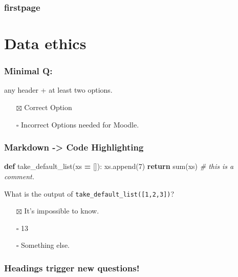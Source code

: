 \documentclass[
]{book}
\newenvironment{Shaded}{\begin{snugshade}}{\end{snugshade}}
\newcommand{\BuiltInTok}[1]{#1}
\newcommand{\CommentTok}[1]{\textcolor[rgb]{0.56,0.35,0.01}{\textit{#1}}}
\newcommand{\ControlFlowTok}[1]{\textcolor[rgb]{0.13,0.29,0.53}{\textbf{#1}}}
\newcommand{\DecValTok}[1]{\textcolor[rgb]{0.00,0.00,0.81}{#1}}
\newcommand{\KeywordTok}[1]{\textcolor[rgb]{0.13,0.29,0.53}{\textbf{#1}}}
\newcommand{\NormalTok}[1]{#1}
\newcommand{\OperatorTok}[1]{\textcolor[rgb]{0.81,0.36,0.00}{\textbf{#1}}}
\providecommand{\tightlist}{%
  \setlength{\itemsep}{0pt}\setlength{\parskip}{0pt}}
\begin{document}
\hypertarget{firstpage}{%
\subsection{firstpage}\label{firstpage}}

\hypertarget{data-ethics}{%
\chapter{Data ethics}\label{data-ethics}}

\hypertarget{minimal-q}{%
\subsection{Minimal Q:}\label{minimal-q}}

any header + at least two options.

\begin{itemize}
\tightlist
\item[$\boxtimes$]
  Correct Option
\item[$\square$]
  Incorrect Options needed for Moodle.
\end{itemize}

\hypertarget{markdown---code-highlighting}{%
\subsection{Markdown -\textgreater{} Code Highlighting}\label{markdown---code-highlighting}}

\begin{Shaded}
\begin{Highlighting}[]
\KeywordTok{def}\NormalTok{ take\_default\_list(xs }\OperatorTok{=}\NormalTok{ []):}
\NormalTok{xs.append(}\DecValTok{7}\NormalTok{)}
\ControlFlowTok{return} \BuiltInTok{sum}\NormalTok{(xs) }\CommentTok{\# this is a comment.}
\end{Highlighting}
\end{Shaded}

What is the output of \texttt{take\_default\_list({[}1,2,3{]})}?

\begin{itemize}
\tightlist
\item[$\boxtimes$]
  It's impossible to know.
\item[$\square$]
  13
\item[$\square$]
  Something else.
\end{itemize}

\hypertarget{headings-trigger-new-questions}{%
\subsection{Headings trigger new questions!}\label{headings-trigger-new-questions}}
\end{document}

